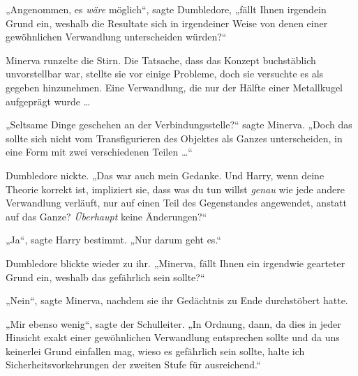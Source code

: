 „Angenommen, es \emph{wäre} möglich“, sagte Dumbledore, „fällt Ihnen irgendein Grund ein, weshalb die Resultate sich in irgendeiner Weise von denen einer gewöhnlichen Verwandlung unterscheiden würden?“

Minerva runzelte die Stirn. Die Tatsache, dass das Konzept buchstäblich unvorstellbar war, stellte sie vor einige Probleme, doch sie versuchte es als gegeben hinzunehmen. Eine Verwandlung, die nur der Hälfte einer Metallkugel aufgeprägt wurde …

„Seltsame Dinge geschehen an der Verbindungsstelle?“ sagte Minerva.
„Doch das sollte sich nicht vom Transfigurieren des Objektes als Ganzes unterscheiden, in eine Form mit zwei verschiedenen Teilen …“

Dumbledore nickte.
„Das war auch mein Gedanke. Und Harry, wenn deine Theorie korrekt ist, impliziert sie, dass was du tun willst \emph{genau} wie jede andere Verwandlung verläuft, nur auf einen Teil des Gegenstandes angewendet, anstatt auf das Ganze? \emph{Überhaupt} keine Änderungen?“

„Ja“, sagte Harry bestimmt.
„Nur darum geht es.“

Dumbledore blickte wieder zu ihr.
„Minerva, fällt Ihnen ein irgendwie gearteter Grund ein, weshalb das gefährlich sein sollte?“

„Nein“, sagte Minerva, nachdem sie ihr Gedächtnis zu Ende durchstöbert hatte.

„Mir ebenso wenig“, sagte der Schulleiter.
„In Ordnung, dann, da dies in jeder Hinsicht exakt einer gewöhnlichen Verwandlung entsprechen sollte und da uns keinerlei Grund einfallen mag, wieso es gefährlich sein sollte, halte ich Sicherheitsvorkehrungen der zweiten Stufe für ausreichend.“

